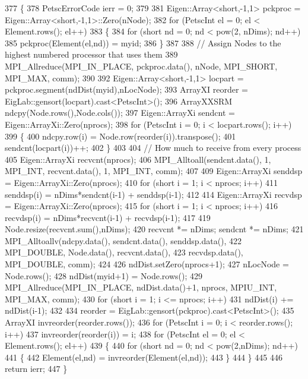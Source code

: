 \begin{DoxyCode}
377 \{
378     PetscErrorCode ierr = 0;
379 
381     Eigen::Array<short,-1,1> pckproc = Eigen::Array<short,-1,1>::Zero(nNode);
382     \textcolor{keywordflow}{for} (PetscInt el = 0; el < Element.rows(); el++)
383     \{
384         \textcolor{keywordflow}{for} (\textcolor{keywordtype}{short} nd = 0; nd < pow(2, nDims); nd++)
385             pckproc(Element(el,nd)) = myid;
386     \}
387 
388     \textcolor{comment}{// Assign Nodes to the highest numbered processor that uses them}
389     MPI\_Allreduce(MPI\_IN\_PLACE, pckproc.data(), nNode, MPI\_SHORT, MPI\_MAX, comm);
390 
392     Eigen::Array<short,-1,1> locpart = pckproc.segment(ndDist(myid),nLocNode);
393     ArrayXI reorder = EigLab::gensort(locpart).cast<PetscInt>();
396     ArrayXXSRM ndcpy(Node.rows(),Node.cols());
397     Eigen::ArrayXi sendcnt = Eigen::ArrayXi::Zero(nprocs);
398     \textcolor{keywordflow}{for} (PetscInt i = 0; i < locpart.rows(); i++)
399     \{
400         ndcpy.row(i) = Node.row(reorder(i)).transpose();
401         sendcnt(locpart(i))++;
402     \}
403 
404     \textcolor{comment}{// How much to receive from every process}
405     Eigen::ArrayXi recvcnt(nprocs);
406     MPI\_Alltoall(sendcnt.data(), 1, MPI\_INT, recvcnt.data(), 1, MPI\_INT, comm);
407 
409     Eigen::ArrayXi senddsp = Eigen::ArrayXi::Zero(nprocs);
410     \textcolor{keywordflow}{for} (\textcolor{keywordtype}{short} i = 1; i < nprocs; i++)
411         senddsp(i) = nDims*sendcnt(i-1) + senddsp(i-1);
412 
414     Eigen::ArrayXi recvdsp = Eigen::ArrayXi::Zero(nprocs);
415     \textcolor{keywordflow}{for} (\textcolor{keywordtype}{short} i = 1; i < nprocs; i++)
416         recvdsp(i) = nDims*recvcnt(i-1) + recvdsp(i-1);
417 
419     Node.resize(recvcnt.sum(),nDims);
420     recvcnt *= nDims; sendcnt *= nDims;
421     MPI\_Alltoallv(ndcpy.data(), sendcnt.data(), senddsp.data(),
422                   MPI\_DOUBLE, Node.data(), recvcnt.data(),
423                   recvdsp.data(), MPI\_DOUBLE, comm);
424 
426     ndDist.setZero(nprocs+1);
427     nLocNode = Node.rows();
428     ndDist(myid+1) = Node.rows();
429     MPI\_Allreduce(MPI\_IN\_PLACE, ndDist.data()+1, nprocs, MPIU\_INT, MPI\_MAX, comm);
430     \textcolor{keywordflow}{for} (\textcolor{keywordtype}{short} i = 1; i <= nprocs; i++)
431         ndDist(i) += ndDist(i-1);
432 
434     reorder = EigLab::gensort(pckproc).cast<PetscInt>();
435     ArrayXI invreorder(reorder.rows());
436     \textcolor{keywordflow}{for} (PetscInt i = 0; i < reorder.rows(); i++)
437       invreorder(reorder(i)) = i;
438     \textcolor{keywordflow}{for} (PetscInt el = 0; el < Element.rows(); el++)
439     \{
440         \textcolor{keywordflow}{for} (\textcolor{keywordtype}{short} nd = 0; nd < pow(2,nDims); nd++)
441         \{
442             Element(el,nd) = invreorder(Element(el,nd));
443         \}
444     \}
445 
446     \textcolor{keywordflow}{return} ierr;
447 \}
\end{DoxyCode}
\mbox{\label{class_mesh_a69a626f34e07b13615847d2d3028f20b}} 
